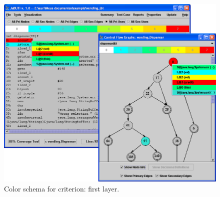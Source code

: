 \begin{figure}[!ht]
\begin{center}
\includegraphics[height=0.40\textheight]{fig/pri-uses-layer1.eps}
\caption{\label{fig:uses-color} Color schema for 
criterion: first layer.}
\end{center}
\end{figure}
